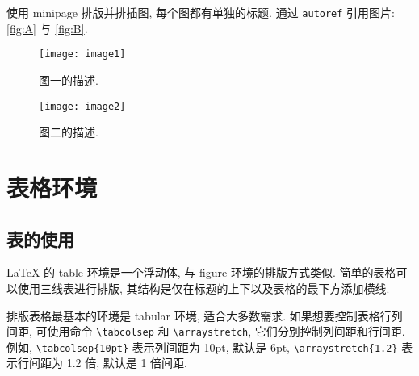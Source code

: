 \documentclass[openany,twoside,12pt]{book}
\theoremstyle{plain}
\begin{document}
使用 minipage 排版并排插图, 每个图都有单独的标题. 通过 \verb|autoref| 引用图片: \autoref{fig:A} 与 \autoref{fig:B}.
\begin{figure}[htp!]
\begin{minipage}[t]{0.48\linewidth}
  \centering
  \texttt{[image: image1]}
  \caption{图一的描述.}
  \label{fig:A}
\end{minipage}
\hfill
\begin{minipage}[t]{0.48\linewidth}
\centering
   \texttt{[image: image2]}
   \caption{图二的描述.}
   \label{fig:B}
\end{minipage}
\end{figure}





\chapter{表格环境}

\section{表的使用}

LaTeX 的 table 环境是一个浮动体, 与 figure 环境的排版方式类似. 简单的表格可以使用三线表进行排版, 其结构是仅在标题的上下以及表格的最下方添加横线.

排版表格最基本的环境是 tabular 环境, 适合大多数需求. 如果想要控制表格行列间距, 可使用命令 \verb|\tabcolsep| 和 \verb|\arraystretch|, 它们分别控制列间距和行间距. 例如, \verb|\tabcolsep{10pt}| 表示列间距为 10pt, 默认是 6pt,  \verb|\arraystretch{1.2}| 表示行间距为 1.2 倍, 默认是 1 倍间距.
\end{document}
